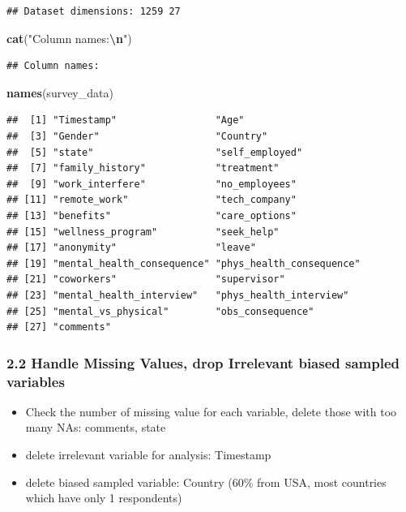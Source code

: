 \documentclass[
]{article}
\newenvironment{Shaded}{\begin{snugshade}}{\end{snugshade}}
\newcommand{\FunctionTok}[1]{\textcolor[rgb]{0.13,0.29,0.53}{\textbf{#1}}}
\newcommand{\NormalTok}[1]{#1}
\newcommand{\SpecialCharTok}[1]{\textcolor[rgb]{0.81,0.36,0.00}{\textbf{#1}}}
\newcommand{\StringTok}[1]{\textcolor[rgb]{0.31,0.60,0.02}{#1}}
\begin{document}
\begin{verbatim}
## Dataset dimensions: 1259 27
\end{verbatim}

\begin{Shaded}
\begin{Highlighting}[]
\FunctionTok{cat}\NormalTok{(}\StringTok{"Column names:}\SpecialCharTok{\textbackslash{}n}\StringTok{"}\NormalTok{)}
\end{Highlighting}
\end{Shaded}

\begin{verbatim}
## Column names:
\end{verbatim}

\begin{Shaded}
\begin{Highlighting}[]
\FunctionTok{names}\NormalTok{(survey\_data)}
\end{Highlighting}
\end{Shaded}

\begin{verbatim}
##  [1] "Timestamp"                 "Age"                      
##  [3] "Gender"                    "Country"                  
##  [5] "state"                     "self_employed"            
##  [7] "family_history"            "treatment"                
##  [9] "work_interfere"            "no_employees"             
## [11] "remote_work"               "tech_company"             
## [13] "benefits"                  "care_options"             
## [15] "wellness_program"          "seek_help"                
## [17] "anonymity"                 "leave"                    
## [19] "mental_health_consequence" "phys_health_consequence"  
## [21] "coworkers"                 "supervisor"               
## [23] "mental_health_interview"   "phys_health_interview"    
## [25] "mental_vs_physical"        "obs_consequence"          
## [27] "comments"
\end{verbatim}

\subsubsection{2.2 Handle Missing Values, drop Irrelevant biased sampled
variables}\label{handle-missing-values-drop-irrelevant-biased-sampled-variables}

\begin{itemize}
\item
  Check the number of missing value for each variable, delete those with
  too many NAs: comments, state
\item
  delete irrelevant variable for analysis: Timestamp
\item
  delete biased sampled variable: Country (60\% from USA, most countries
  which have only 1 respondents)
\end{itemize}
\end{document}

